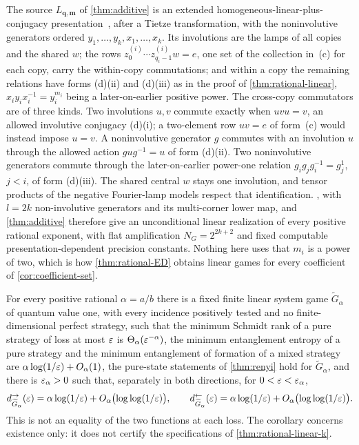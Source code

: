 \begin{remark}\label{rem:SV-route-k}
The source $L_{\mathbf q,\mathbf m}$ of \cref{thm:additive} is an extended homogeneous-linear-plus-conjugacy
presentation~\cite[\S6, (a)--(d)]{SV18}, after a Tietze transformation, with the noninvolutive generators ordered
$y_1,\dots,y_k,x_1,\dots,x_k$. Its involutions are the lamps of all copies and the shared $w$; the rows $z^{(i)}_0\cdots
z^{(i)}_{q_i-1}w=e$, one set of the collection in~(c) for each copy, carry the within-copy commutations; and within a copy the remaining
relations have forms (d)(ii) and (d)(iii) as in the proof of \cref{thm:rational-linear}, $x_iy_ix_i^{-1}=y_i^{m_i}$ being a
later-on-earlier positive power. The cross-copy commutators are of three kinds. Two involutions $u,v$ commute exactly when $uvu=v$,
an allowed involutive conjugacy (d)(i); a two-element row $uv=e$ of form~(c) would instead impose $u=v$. A noninvolutive generator
$g$ commutes with an involution $u$ through the allowed action $gug^{-1}=u$ of form (d)(ii). Two noninvolutive generators commute
through the later-on-earlier power-one relation $g_ig_jg_i^{-1}=g_j^1$, $j<i$, of form (d)(iii). The shared central $w$ stays one
involution, and tensor products of the negative Fourier-lamp models respect that identification. , with $l=2k$
non-involutive generators and its multi-corner lower map, and \cref{thm:additive} therefore give an unconditional linear realization
of every positive rational exponent, with flat amplification $N_G=2^{2k+2}$ and fixed computable presentation-dependent precision
constants. Nothing here uses that $m_i$ is a power of two, which is how \cref{thm:rational-ED} obtains linear games for every
coefficient of \cref{cor:coefficient-set}.
\end{remark}

\begin{corollary}\label{cor:linear-existence}
For every positive rational $\alpha=a/b$ there is a fixed finite linear system game $\widetilde G_\alpha$ of quantum value one, with every
incidence positively tested and no finite-dimensional perfect strategy, such that the minimum Schmidt rank of a pure strategy of
loss at most $\varepsilon$ is $\Theta_\alpha(\varepsilon^{-\alpha})$, the minimum entanglement entropy of a pure strategy and the minimum entanglement of
formation of a mixed strategy are $\alpha\log(1/\varepsilon)+O_\alpha(1)$, the pure-state statements of \cref{thm:renyi} hold for
$\widetilde G_\alpha$, and there is $\varepsilon_\alpha>0$ such that, separately in both directions, for $0<\varepsilon<\varepsilon_\alpha$,
\[
d^\to_{\widetilde G_\alpha}(\varepsilon)=\alpha\log(1/\varepsilon)+O_\alpha\bigl(\log\log(1/\varepsilon)\bigr),\qquad
d^\leftarrow_{\widetilde G_\alpha}(\varepsilon)=\alpha\log(1/\varepsilon)+O_\alpha\bigl(\log\log(1/\varepsilon)\bigr).
\]
This is not an equality of the two functions at each loss. The corollary concerns existence only: it does not certify the
specifications of \cref{thm:rational-linear-k}.
\end{corollary}

